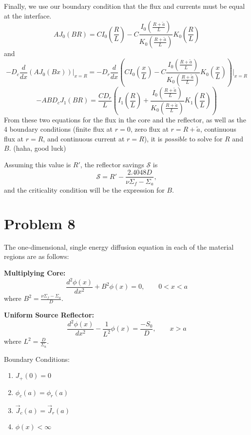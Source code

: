 \documentclass{article}
\newcommand{\Xs}{\Sigma}
\newcommand{\cur}{\vec{J}}
\begin{document}
Finally, we use our boundary condition that the flux and currents must be equal at the interface.
$$ A J_0(B R) = C I_0(\frac{R}{L}) - C \frac{I_0(\frac{R+\tilde{a}}{L})}{K_0(\frac{R+\tilde{a}}{L})} K_0(\frac{R}{L}) $$
and 
$$ -D_c\frac{d}{dx}\left(A J_0(B x)\right)\bigg|_{x=R} = -D_r\frac{d}{dx}\left(C I_0\left(\frac{x}{L}\right) - C \frac{I_0(\frac{R+\tilde{a}}{L})}{K_0(\frac{R+\tilde{a}}{L})} K_0\left(\frac{x}{L}\right)\right)\bigg|_{x=R}$$
$$ -ABD_c J_1(B R) = \frac{CD_r}{L}\left(I_1\left(\frac{R}{L}\right) + \frac{I_0(\frac{R+\tilde{a}}{L})}{K_0(\frac{R+\tilde{a}}{L})} K_1\left(\frac{R}{L}\right)\right)$$
From these two equations for the flux in the core and the reflector, as well as the 4 boundary conditions (finite flux at $r=0$, zero flux at $r=R+\tilde{a}$, continuous flux at $r=R$, and continuous current at $r=R$), it is \textit{possible} to solve for $R$ and $B$. (haha, good luck)

Assuming this value is $R'$, the reflector savings $\mathcal{S}$ is 
$$ \mathcal{S} = R' - \frac{2.4048D}{\nu\Xs_f-\Xs_a} ,$$
and the criticality condition will be the expression for $B$.

\section*{Problem 8}

The one-dimensional, single energy diffusion equation in each of the material regions are as follows:

\textbf{Multiplying Core:}
$$ \frac{d^2\phi(x)}{dx^2} + B^2\phi(x) = 0 , \qquad 0 < x < a $$
where $B^2 = \frac{\nu\Xs_f - \Xs_a}{D}.$ 

\textbf{Uniform Source Reflector:}
$$ \frac{d^2\phi(x)}{dx^2} - \frac{1}{L^2}\phi(x) = \frac{-S_0}{D}, \qquad x > a $$
where $L^2 = \frac{D}{\Xs_a}$.

Boundary Conditions:
\begin{enumerate}
\item $ J_+(0) = 0 $
\item $ \phi_c(a) = \phi_r(a) $
\item $ \cur_c(a) = \cur_r(a) $
\item $ \phi(x) < \infty $
\end{enumerate}
\end{document}
